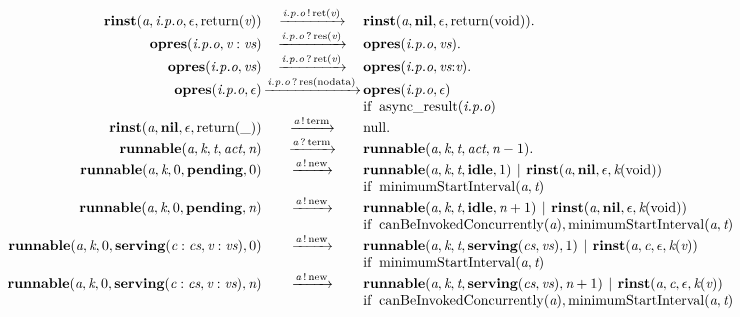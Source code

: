\[\begin{array}{r@{}c@{}llllll}
\\\Pfact{\Tstep{\Trinst{\Tvar{A}}{\Top{\Tvar{O}}{\Tvar{P}}{\Tvar{I}}}{\Teps}{\Treturn{\Tvar{V}}}}{\Tsay{\Top{\Tvar{O}}{\Tvar{P}}{\Tvar{I}}}{\Tret{\Tvar{V}}}}{\Trinst{\Tvar{A}}{\Tnil}{\Teps}{\Treturn{\Tvoid}}}}
\\\Pfact{\Tstep{\Topres{\Top{\Tvar{O}}{\Tvar{P}}{\Tvar{I}}}{\Tcons{\Tvar{V}}{\Tvar{Vs}}}}{\Thear{\Top{\Tvar{O}}{\Tvar{P}}{\Tvar{I}}}{\Tres{\Tvar{V}}}}{\Topres{\Top{\Tvar{O}}{\Tvar{P}}{\Tvar{I}}}{\Tvar{Vs}}}}
\\\Pfact{\Tstep{\Topres{\Top{\Tvar{O}}{\Tvar{P}}{\Tvar{I}}}{\Tvar{Vs}}}{\Thear{\Top{\Tvar{O}}{\Tvar{P}}{\Tvar{I}}}{\Tret{\Tvar{V}}}}{\Topres{\Top{\Tvar{O}}{\Tvar{P}}{\Tvar{I}}}{\Tseq{\Tvar{Vs}}{\Tvar{V}}}}}
\\\Prule{\Tstep{\Topres{\Top{\Tvar{O}}{\Tvar{P}}{\Tvar{I}}}{\Teps}}{\Thear{\Top{\Tvar{O}}{\Tvar{P}}{\Tvar{I}}}{\Tres{\Tnodata}}}{\Topres{\Top{\Tvar{O}}{\Tvar{P}}{\Tvar{I}}}{\Teps}}}{\Tasyncresult{\Top{\Tvar{O}}{\Tvar{P}}{\Tvar{I}}}}
\\\Pfact{\Tstep{\Trinst{\Tvar{A}}{\Tnil}{\Teps}{\Treturn{\_}}}{\Tsay{\Tvar{A}}{\Tterm}}{\Tnull}}
\\\Pfact{\Tstep{\Trunnable{\Tvar{A}}{\Tvar{K}}{\Tvar{T}}{\Tvar{Act}}{\Tvar{N}}}{\Thear{\Tvar{A}}{\Tterm}}{\Trunnable{\Tvar{A}}{\Tvar{K}}{\Tvar{T}}{\Tvar{Act}}{\Tminus{\Tvar{N}}{1}}}}
\\\Prule{\Tstep{\Trunnable{\Tvar{A}}{\Tvar{K}}{0}{\Tpending}{0}}{\Tsay{\Tvar{A}}{\Tnew}}{\Tpar{\Trunnable{\Tvar{A}}{\Tvar{K}}{\Tvar{T}}{\Tidle}{1}}{\Trinst{\Tvar{A}}{\Tnil}{\Teps}{\Tap{\Tvar{K}}{\Tvoid}}}}}{\TminimumStartInterval{\Tvar{A}}{\Tvar{T}}}
\\\Prule{\Tstep{\Trunnable{\Tvar{A}}{\Tvar{K}}{0}{\Tpending}{\Tvar{N}}}{\Tsay{\Tvar{A}}{\Tnew}}{\Tpar{\Trunnable{\Tvar{A}}{\Tvar{K}}{\Tvar{T}}{\Tidle}{\Tplus{\Tvar{N}}{1}}}{\Trinst{\Tvar{A}}{\Tnil}{\Teps}{\Tap{\Tvar{K}}{\Tvoid}}}}}{\TcanBeInvokedConcurrently{\Tvar{A}},\TminimumStartInterval{\Tvar{A}}{\Tvar{T}}}
\\\Prule{\Tstep{\Trunnable{\Tvar{A}}{\Tvar{K}}{0}{\Tserving{\Tcons{\Tvar{C}}{\Tvar{Cs}}}{\Tcons{\Tvar{V}}{\Tvar{Vs}}}}{0}}{\Tsay{\Tvar{A}}{\Tnew}}{\Tpar{\Trunnable{\Tvar{A}}{\Tvar{K}}{\Tvar{T}}{\Tserving{\Tvar{Cs}}{\Tvar{Vs}}}{1}}{\Trinst{\Tvar{A}}{\Tvar{C}}{\Teps}{\Tap{\Tvar{K}}{\Tvar{V}}}}}}{\TminimumStartInterval{\Tvar{A}}{\Tvar{T}}}
\\\Prule{\Tstep{\Trunnable{\Tvar{A}}{\Tvar{K}}{0}{\Tserving{\Tcons{\Tvar{C}}{\Tvar{Cs}}}{\Tcons{\Tvar{V}}{\Tvar{Vs}}}}{\Tvar{N}}}{\Tsay{\Tvar{A}}{\Tnew}}{\Tpar{\Trunnable{\Tvar{A}}{\Tvar{K}}{\Tvar{T}}{\Tserving{\Tvar{Cs}}{\Tvar{Vs}}}{\Tplus{\Tvar{N}}{1}}}{\Trinst{\Tvar{A}}{\Tvar{C}}{\Teps}{\Tap{\Tvar{K}}{\Tvar{V}}}}}}{\TcanBeInvokedConcurrently{\Tvar{A}},\TminimumStartInterval{\Tvar{A}}{\Tvar{T}}}

\end{array}\]
